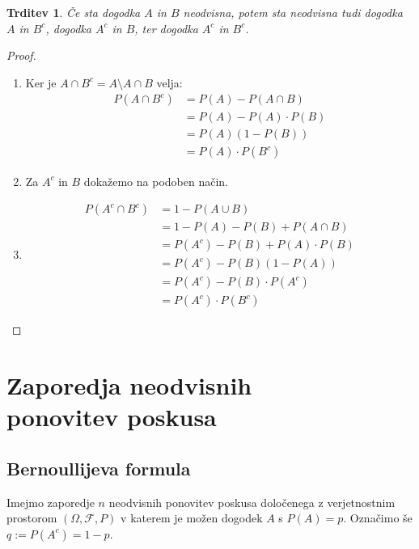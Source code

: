 \documentclass[12pt]{book}
\def\n{\noindent}
\theoremstyle{definition}
\theoremstyle{plain}
\theoremstyle{plain}
\newtheorem{trditev}{Trditev}
\theoremstyle{plain}
\theoremstyle{remark}
\begin{document}
\begin{trditev}
    Če sta dogodka $A$ in $B$ neodvisna, potem sta neodvisna tudi dogodka $A$ in $B^c$, dogodka $A^c$ in $B$, ter dogodka $A^c$ in $B^c$.
\end{trditev}

\begin{proof}
    ~

    \begin{enumerate}[label=(\roman*)]
        \item Ker je $A \cap B^c = A \setminus A \cap B$ velja: 
        $$
        \begin{aligned}
            P\left(A \cap B^c\right)&=P(A)-P(A \cap B) \\
            &=P(A)-P(A) \cdot P(B) \\
            &=P(A) (1-P(B)) \\
            &=P(A) \cdot P\left(B^c\right)
        \end{aligned}
        $$
        \item Za $A^c$ in $B$ dokažemo na podoben način.
        \item 
        $$
        \begin{aligned}
            P\left(A^c \cap B^c\right)&=1-P(A \cup B) \\
            &= 1-P(A)-P(B)+P(A \cap B) \\
            &= P\left(A^c\right)-P(B)+P(A) \cdot P(B) \\
            &= P\left(A^c\right)-P(B)(1-P(A)) \\
            &= P\left(A^c\right)-P(B) \cdot P\left(A^c\right) \\
            &= P\left(A^c\right) \cdot P\left(B^c\right)
        \end{aligned}
        $$
    \end{enumerate} 
\end{proof}

\chapter[Zaporedja neodvisnih ponovitev poskusa]{Zaporedja neodvisnih\\ponovitev poskusa}

\section{Bernoullijeva formula}

\n Imejmo zaporedje $n$ neodvisnih ponovitev poskusa določenega z verjetnostnim prostorom $(\Omega, \mathcal{F}, P)$ v katerem je možen dogodek $A$ s $P(A) = p$. Označimo še $q := P(A^c) = 1-p$. 
\end{document}
